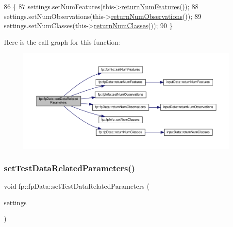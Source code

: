 \begin{DoxyCode}
86                                                                   \{
87                 settings.setNumFeatures(this->\hyperlink{classfp_1_1fpData_a95088e33b280e5c82b3543033d8852e1}{returnNumFeatures}());
88                 settings.setNumObservations(this->\hyperlink{classfp_1_1fpData_a9056a8c0e7e48fe9aa591269064ecc43}{returnNumObservations}());
89                 settings.setNumClasses(this->\hyperlink{classfp_1_1fpData_a7abfc93af30b7262d59b6d304796a09d}{returnNumClasses}());
90             \}
\end{DoxyCode}
Here is the call graph for this function\+:\nopagebreak
\begin{figure}[H]
\begin{center}
\leavevmode
\includegraphics[width=350pt]{classfp_1_1fpData_ab48923d57206e17b88f0d89833051b43_cgraph}
\end{center}
\end{figure}
\mbox{\label{classfp_1_1fpData_ab60d2098334e253a0bf3115f029c1996}} 
\subsubsection{\texorpdfstring{set\+Test\+Data\+Related\+Parameters()}{setTestDataRelatedParameters()}}
{\footnotesize\ttfamily void fp\+::fp\+Data\+::set\+Test\+Data\+Related\+Parameters (\begin{DoxyParamCaption}\item[{\hyperlink{classfp_1_1fpInfo}{fp\+Info} \&}]{settings }\end{DoxyParamCaption})\hspace{0.3cm}{\ttfamily [inline]}}



